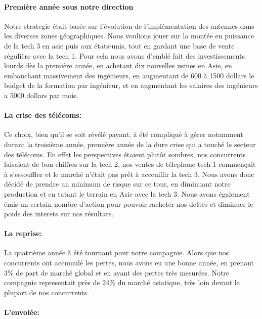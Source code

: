 \paragraph{Première année sous notre direction}
Notre strategie était basée sur l'évolution de l'implémentation des
antennes dans les diverses zones géographiques. Nous voulions jouer
sur la montée en puissance de la tech 3 en asie puis aux états-unis,
tout en gardant une base de vente régulière avec la tech 1. Pour cela
nous avons d'emblé fait des investissements lourds dès la première
année, en achetant dix nouvelles usines en Asie, en embauchant
massivement des ingénieurs, en augmentant de 600 à 1500 dollars le
budget de la formation par ingénieur, et en augmentant les salaires
des ingénieurs a 5000 dollars par mois.

\paragraph{La crise des télécoms:}

Ce choix, bien qu'il se soit révélé payant, à été compliqué à gérer
notamment durant la troisième année, première année de la dure crise
qui a touché le secteur des télécoms. En effet les perspectives
étaient plutôt sombres, nos concurrents faisaient de bon chiffres sur
la tech 2, nos ventes de télephone tech 1 commençait à s'essouffler et
le marché n'était pas prêt à acceuillir la tech 3. Nous avons donc
décidé de prendre un minimum de risque sur ce tour, en diminuant notre
production et en tatant le terrain en Asie avec la tech 3. Nous avons
également émis un certain nombre d'action pour pouvoir racheter nos
dettes et diminuer le poids des interets sur nos résultats.

\paragraph{La reprise:}

La quatrième année à été tournant pour notre compagnie. Alors que nos
concurrents ont accumulé les pertes, nous avons eu une bonne année, en
prenant 3\% de part de marché global et en ayant des pertes très
mesurées. Notre compagnie representait près de 24\% du marché
asiatique, très loin devant la plupart de nos concurrents.

\paragraph{L'envolée:}

